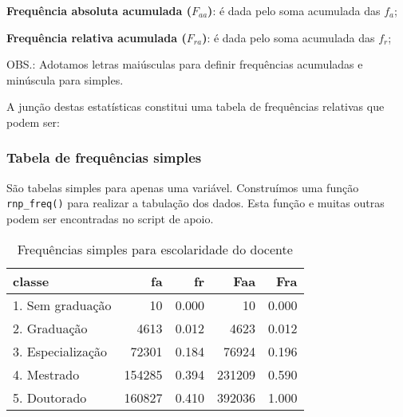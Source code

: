 \documentclass[12pt,]{style/krantz}
\makeatletter
\newenvironment{Shaded}{\begin{snugshade}}{\end{snugshade}}
\newcommand{\DataTypeTok}[1]{\textcolor[rgb]{0.13,0.29,0.53}{#1}}
\newcommand{\DecValTok}[1]{\textcolor[rgb]{0.00,0.00,0.81}{#1}}
\newcommand{\KeywordTok}[1]{\textcolor[rgb]{0.13,0.29,0.53}{\textbf{#1}}}
\newcommand{\NormalTok}[1]{#1}
\newcommand{\OperatorTok}[1]{\textcolor[rgb]{0.81,0.36,0.00}{\textbf{#1}}}
\newcommand{\OtherTok}[1]{\textcolor[rgb]{0.56,0.35,0.01}{#1}}
\newcommand{\StringTok}[1]{\textcolor[rgb]{0.31,0.60,0.02}{#1}}
\newenvironment{kframe}{%
\medskip{}
\setlength{\fboxsep}{.8em}
 \def\at@end@of@kframe{}%
 \ifinner\ifhmode%
  \def\at@end@of@kframe{\end{minipage}}%
  \begin{minipage}{\columnwidth}%
 \fi\fi%
 \def\FrameCommand##1{\hskip\@totalleftmargin \hskip-\fboxsep
 \colorbox{shadecolor}{##1}\hskip-\fboxsep
     \hskip-\linewidth \hskip-\@totalleftmargin \hskip\columnwidth}%
 \MakeFramed {\advance\hsize-\width
   \@totalleftmargin\z@ \linewidth\hsize
   \@setminipage}}%
 {\par\unskip\endMakeFramed%
 \at@end@of@kframe}
\renewenvironment{Shaded}{\begin{kframe}}{\end{kframe}}
\theoremstyle{definition}
\theoremstyle{definition}
\theoremstyle{definition}
\theoremstyle{remark}
\makeatother
\begin{document}
\textbf{Frequência absoluta acumulada (\(F_{aa}\))}: é dada pelo soma acumulada das \(f_{a}\);

\textbf{Frequência relativa acumulada (\(F_{ra}\))}: é dada pelo soma acumulada das \(f_{r}\);

OBS.: Adotamos letras maiúsculas para definir frequências acumuladas e minúscula para simples.

A junção destas estatísticas constitui uma tabela de frequências relativas que podem ser:

\hypertarget{tabela-de-frequencias-simples}{%
\subsubsection{Tabela de frequências simples}\label{tabela-de-frequencias-simples}}

São tabelas simples para apenas uma variável. Construímos uma função \texttt{rnp\_freq()} para realizar a tabulação dos dados. Esta função e muitas outras podem ser encontradas no script de apoio.

\begin{Shaded}
\end{Shaded}

\begin{table}[!h]

\caption{\label{tab:tab04}Frequências simples para escolaridade do docente}
\centering
\begin{tabular}{lrrrr}
\toprule
classe & fa & fr & Faa & Fra\\
\midrule
1. Sem graduação & 10 & 0.000 & 10 & 0.000\\
2. Graduação & 4613 & 0.012 & 4623 & 0.012\\
3. Especialização & 72301 & 0.184 & 76924 & 0.196\\
4. Mestrado & 154285 & 0.394 & 231209 & 0.590\\
5. Doutorado & 160827 & 0.410 & 392036 & 1.000\\
\bottomrule
\end{tabular}
\end{table}
\end{document}
